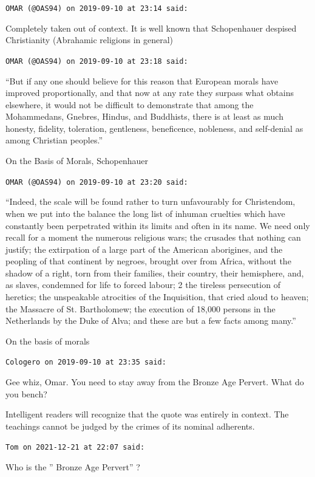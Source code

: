 \begin{footnotesize}
\begin{sffamily}
\texttt{OMAR (@OAS94) on 2019-09-10 at 23:14 said:}

Completely taken out of context. It is well known that Schopenhauer despised Christianity (Abrahamic religions in general)

\hfill

\texttt{OMAR (@OAS94) on 2019-09-10 at 23:18 said:}

``But if any one should believe for this reason that European morals have improved proportionally, and that now at any rate they surpass what obtains elsewhere, it would not be difficult to demonstrate that among the Mohammedans, Gnebres, Hindus, and Buddhists, there is at least as much honesty, fidelity, toleration, gentleness, beneficence, nobleness, and self-denial as among Christian peoples.''

On the Basis of Morals, Schopenhauer

\hfill

\texttt{OMAR (@OAS94) on 2019-09-10 at 23:20 said:}

``Indeed, the scale will be found rather to turn unfavourably for Christendom, when we put into the balance the long list of inhuman cruelties which have constantly been perpetrated within its limits and often in its name. We need only recall for a moment the numerous religious wars; the crusades that nothing can justify; the extirpation of a large part of the American aborigines, and the peopling of that continent by negroes, brought over from Africa, without the shadow of a right, torn from their families, their country, their hemisphere, and, as slaves, condemned for life to forced labour; 2 the tireless persecution of heretics; the unspeakable atrocities of the Inquisition, that cried aloud to heaven; the Massacre of St. Bartholomew; the execution of 18,000 persons in the Netherlands by the Duke of Alva; and these are but a few facts among many.''

On the basis of morals

\hfill

\texttt{Cologero on 2019-09-10 at 23:35 said:}

Gee whiz, Omar. You need to stay away from the Bronze Age Pervert. What do you bench?

Intelligent readers will recognize that the quote was entirely in context. The teachings cannot be judged by the crimes of its nominal adherents.

\hfill

\texttt{Tom on 2021-12-21 at 22:07 said:}

Who is the '' Bronze Age Pervert'' ?

\end{sffamily}
\end{footnotesize}

